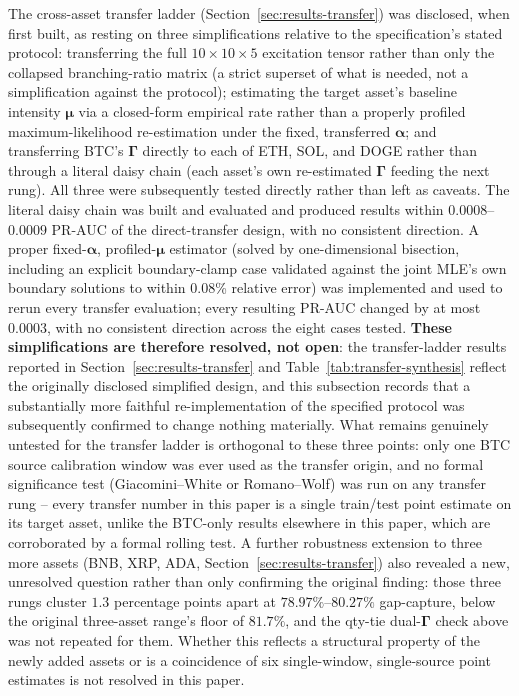 The cross-asset transfer ladder (Section~\ref{sec:results-transfer}) was
disclosed, when first built, as resting on three simplifications relative
to the specification's stated protocol: transferring the full
$10\times10\times5$ excitation tensor rather than only the collapsed
branching-ratio matrix (a strict superset of what is needed, not a
simplification against the protocol); estimating the target asset's
baseline intensity $\boldsymbol\mu$ via a closed-form empirical rate
rather than a properly profiled maximum-likelihood re-estimation under
the fixed, transferred $\boldsymbol\alpha$; and transferring BTC's
$\boldsymbol\Gamma$ directly to each of ETH, SOL, and DOGE rather than
through a literal daisy chain (each asset's own re-estimated
$\boldsymbol\Gamma$ feeding the next rung). All three were subsequently
tested directly rather than left as caveats. The literal daisy chain was
built and evaluated and produced results within $0.0008$--$0.0009$ PR-AUC
of the direct-transfer design, with no consistent direction. A proper
fixed-$\boldsymbol\alpha$, profiled-$\boldsymbol\mu$ estimator (solved by
one-dimensional bisection, including an explicit boundary-clamp case
validated against the joint MLE's own boundary solutions to within
0.08\% relative error) was implemented and used to rerun every transfer
evaluation; every resulting PR-AUC changed by at most $0.0003$, with no
consistent direction across the eight cases tested. \textbf{These
simplifications are therefore resolved, not open}: the transfer-ladder
results reported in Section~\ref{sec:results-transfer} and
Table~\ref{tab:transfer-synthesis} reflect the originally disclosed
simplified design, and this subsection records that a substantially more
faithful re-implementation of the specified protocol was subsequently
confirmed to change nothing materially. What remains genuinely untested
for the transfer ladder is orthogonal to these three points: only one
BTC source calibration window was ever used as the transfer origin, and
no formal significance test (Giacomini--White or Romano--Wolf) was run on
any transfer rung -- every transfer number in this paper is a single
train/test point estimate on its target asset, unlike the BTC-only
results elsewhere in this paper, which are corroborated by a formal
rolling test. A further robustness extension to three more assets
(BNB, XRP, ADA, Section~\ref{sec:results-transfer}) also revealed a
new, unresolved question rather than only confirming the original
finding: those three rungs cluster $1.3$ percentage points apart at
$78.97\%$--$80.27\%$ gap-capture, below the original three-asset range's
floor of $81.7\%$, and the qty-tie dual-$\boldsymbol\Gamma$ check above
was not repeated for them. Whether this reflects a structural property
of the newly added assets or is a coincidence of six single-window,
single-source point estimates is not resolved in this paper.

